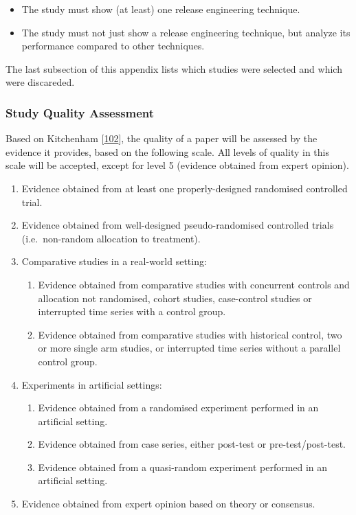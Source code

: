 \documentclass[]{book}
\providecommand{\tightlist}{%
  \setlength{\itemsep}{0pt}\setlength{\parskip}{0pt}}
\begin{document}
\begin{itemize}
\tightlist
\item
  The study must show (at least) one release engineering technique.
\item
  The study must not just show a release engineering technique, but
  analyze its performance compared to other techniques.
\end{itemize}

The last subsection of this appendix lists which studies were selected
and which were discareded.

\subsubsection{Study Quality Assessment}\label{study-quality-assessment}

Based on Kitchenham
{[}\protect\hyperlink{ref-kitchenham2004procedures}{102}{]}, the quality
of a paper will be assessed by the evidence it provides, based on the
following scale. All levels of quality in this scale will be accepted,
except for level 5 (evidence obtained from expert opinion).

\begin{enumerate}
\def\labelenumi{\arabic{enumi}.}
\tightlist
\item
  Evidence obtained from at least one properly-designed randomised
  controlled trial.
\item
  Evidence obtained from well-designed pseudo-randomised controlled
  trials (i.e.~non-random allocation to treatment).
\item
  Comparative studies in a real-world setting:

  \begin{enumerate}
  \def\labelenumii{\arabic{enumii}.}
  \tightlist
  \item
    Evidence obtained from comparative studies with concurrent controls
    and allocation not randomised, cohort studies, case-control studies
    or interrupted time series with a control group.
  \item
    Evidence obtained from comparative studies with historical control,
    two or more single arm studies, or interrupted time series without a
    parallel control group.
  \end{enumerate}
\item
  Experiments in artificial settings:

  \begin{enumerate}
  \def\labelenumii{\arabic{enumii}.}
  \tightlist
  \item
    Evidence obtained from a randomised experiment performed in an
    artificial setting.
  \item
    Evidence obtained from case series, either post-test or
    pre-test/post-test.
  \item
    Evidence obtained from a quasi-random experiment performed in an
    artificial setting.
  \end{enumerate}
\item
  Evidence obtained from expert opinion based on theory or consensus.
\end{enumerate}
\end{document}
